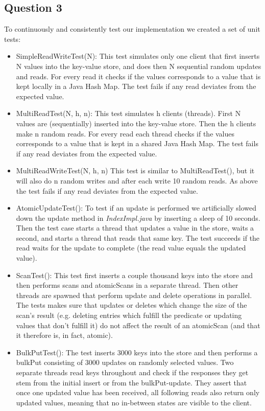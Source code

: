 \documentclass[12pt,a4paper]{article}
\begin{document}
\subsection*{Question 3}
\label{sec:pq3}
To continuously and consistently test our implementation we created a set of unit tests:
\begin{itemize}
\item SimpleReadWriteTest(N): This test simulates only one client that first inserts N values into the key-value store, and does then N sequential random updates and reads. For every read it checks if the values corresponds to a value that is kept locally in a Java Hash Map. The test fails if any read deviates from the expected value.
\item MultiReadTest(N, h, n): This test simulates h clients (threads). First N values are (sequentially) inserted into the key-value store. Then the h clients make n random reads. For every read each thread checks if the values corresponds to a value that is kept in a shared Java Hash Map. The test fails if any read deviates from the expected value.
\item MultiReadWriteTest(N, h, n) This test is similar to MultiReadTest(), but it will also do n random writes and after each write 10 random reads. As above the test fails if any read deviates from the expected value.
\item AtomicUpdateTest(): To test if an update is performed we artificially slowed down the update method in \emph{IndexImpl.java} by inserting a sleep of 10 seconds. Then the test case starts a thread that updates a value in the store, waits a second, and starts a thread that reads that same key. The test succeeds if the read waits for the update to complete (the read value equals the updated value).
\item ScanTest(): This test first inserts a couple thousand keys into the store and then performs scans and atomicScans in a separate thread. Then other threads are spawned that perform update and delete operations in parallel. The tests makes sure that updates or deletes which change the size of the scan's result (e.g. deleting entries which fulfill the predicate or updating values that don't fulfill it) do not affect the result of an atomicScan (and that it therefore is, in fact, atomic).
\item BulkPutTest(): The test inserts 3000  keys into the store and then performs a bulkPut consisting of 3000 updates on randomly selected values. Two separate threads read keys throughout and check if the responses they get stem from the initial insert or from the bulkPut-update. They assert that once one updated value has been received, all following reads also return only updated values, meaning that no in-between states are visible to the client.


\end{itemize}
\end{document}
